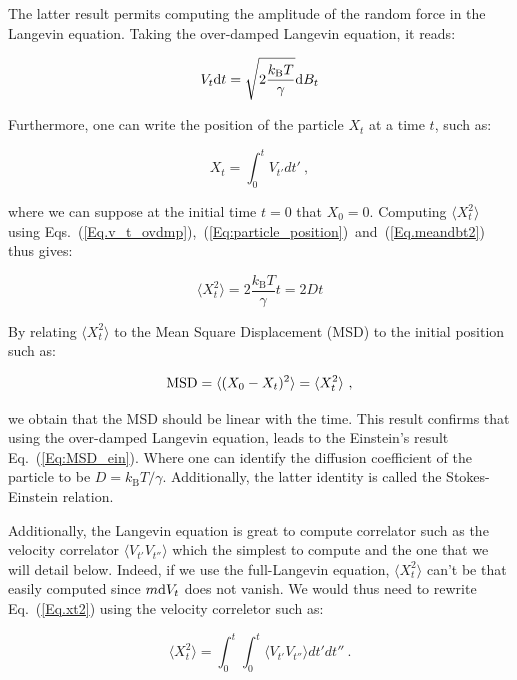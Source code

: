 The latter result permits computing the amplitude of the random force in the Langevin equation. Taking the over-damped Langevin equation, it reads:

\begin{equation}
	V_t\textnormal{d}t  = \sqrt{2\frac{k_\mathrm{B}T}{\gamma}} \textnormal{d}B_t 
	\label{Eq.v_t_ovdmp}
\end{equation}

Furthermore, one can write the position of the particle $X_t$ at a time $t$, such as:

\begin{equation}
	X_t = \int _0 ^t V_{t'}dt'~,
	\label{Eq:particle_position}
\end{equation}

where we can suppose at the initial time $t=0$ that $X_0 = 0$. Computing 
$\langle X_t^2 \rangle$ using Eqs.~(\ref{Eq.v_t_ovdmp}),~(\ref{Eq:particle_position})~and~(\ref{Eq.meandbt2}) thus gives:

\begin{equation}
	\langle X_t ^2 \rangle =  2\frac{k_\mathrm{B}T}{\gamma}t = 2Dt
	\label{Eq.xt2}
\end{equation}

By relating $\langle X_t ^2 \rangle$ to the Mean Square Displacement (\gls{MSD}) to the initial position such as:

\begin{equation}
	\textnormal{MSD} = \langle (X_0 - X_ t)^2 \rangle =  \langle X_t ^2 \rangle~,
\end{equation}


we obtain that the \gls{MSD} should be linear with the time. This result confirms that using the over-damped Langevin equation, leads to the Einstein's result Eq.~(\ref{Eq:MSD_ein}). Where one can identify the diffusion coefficient of the particle to be $D = k_\mathrm{B}T / \gamma$. Additionally, the latter identity is called the Stokes-Einstein  relation.


Additionally, the Langevin equation is great to compute correlator such as the velocity correlator $ \langle V_{t'}V_{t''} \rangle$ which the simplest to compute and the one that we will detail below. Indeed, if we use the full-Langevin equation, $\langle X_t ^2 \rangle$ can't be that easily computed since $m\textnormal{d} V_t$ does not vanish. We would thus need to rewrite Eq.~(\ref{Eq.xt2})  using the velocity correletor such as:

\begin{equation}
	\langle X_t ^ 2 \rangle  = \int _0 ^ {t} \int _0 ^{t} \langle V_{t'}V_{t''} \rangle dt'dt'' ~.
	\label{Eq.int_msd}
\end{equation}


